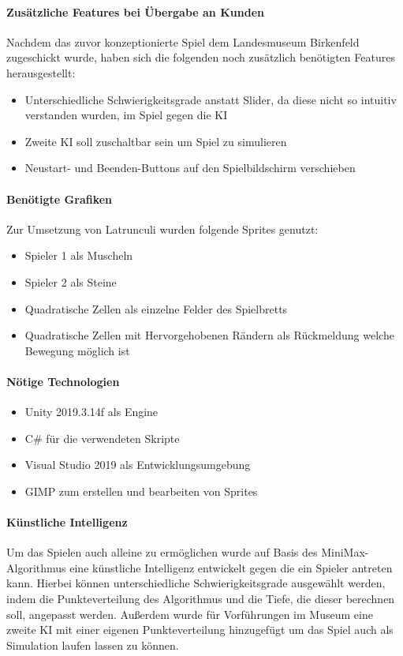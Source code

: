 \paragraph{Zusätzliche Features bei Übergabe an Kunden}
Nachdem das zuvor konzeptionierte Spiel dem Landesmuseum Birkenfeld zugeschickt wurde, haben sich die folgenden noch zusätzlich benötigten Features herausgestellt:
\begin{itemize}
	\item Unterschiedliche Schwierigkeitsgrade anstatt Slider, da diese nicht so intuitiv verstanden wurden, im Spiel gegen die KI
	\item Zweite KI soll zuschaltbar sein um Spiel zu simulieren
	\item Neustart- und Beenden-Buttons auf den Spielbildschirm verschieben	
\end{itemize}


\paragraph{Benötigte Grafiken}
Zur Umsetzung von Latrunculi wurden folgende Sprites genutzt:
\begin{itemize}
	\item Spieler 1 als Muscheln
	\item Spieler 2 als Steine
	\item Quadratische Zellen als einzelne Felder des Spielbretts
	\item Quadratische Zellen mit Hervorgehobenen Rändern als Rückmeldung welche Bewegung möglich ist
\end{itemize}

\paragraph{Nötige Technologien}
\begin{itemize}
	\item Unity 2019.3.14f als Engine
	\item C\# für die verwendeten Skripte
	\item Visual Studio 2019 als Entwicklungsumgebung 
	\item GIMP zum erstellen und bearbeiten von Sprites
\end{itemize}

\paragraph{Künstliche Intelligenz}
Um das Spielen auch alleine zu ermöglichen wurde auf Basis des MiniMax-Algorithmus eine künstliche Intelligenz entwickelt gegen die ein Spieler antreten kann. Hierbei können unterschiedliche Schwierigkeitsgrade ausgewählt werden, indem die Punkteverteilung des Algorithmus und die Tiefe, die dieser berechnen soll, angepasst werden. Außerdem wurde für Vorführungen im Museum eine zweite KI mit einer eigenen Punkteverteilung hinzugefügt um das Spiel auch als Simulation laufen lassen zu können.

